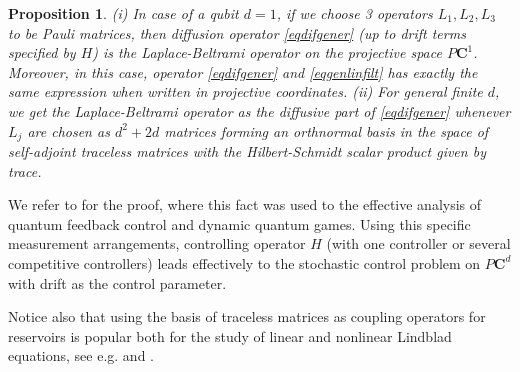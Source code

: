 \documentclass[12pt]{article}
\def\C{\mathbf{C}}
\newtheorem{prop}{Proposition}[section]
\begin{document}
\begin{prop}
\label{propOnLB}
 (i) In case of a qubit $d=1$, if we choose 3 operators $L_1,L_2,L_3$
to be Pauli matrices, then diffusion operator \eqref{eqdifgener}
(up to drift terms specified by $H$) is the
Laplace-Beltrami operator on the projective space $P\C^1$. Moreover, in this case,
operator \eqref{eqdifgener}  and \eqref{eqgenlinfilt} has exactly the same expression when
written in projective coordinates. (ii) For general finite $d$, we get the Laplace-Beltrami
operator as the diffusive part of \eqref{eqdifgener} whenever $L_j$ are chosen as $d^2+2d$
matrices forming an orthnormal basis in the space of self-adjoint traceless matrices
with the Hilbert-Schmidt scalar product given by trace.
\end{prop}

We refer to \cite{KolDynQuGames} for the proof, where this fact was used to the effective analysis
of quantum feedback control and dynamic quantum games. Using this specific measurement arrangements,
controlling operator $H$ (with one controller or several competitive controllers) leads effectively
to the stochastic control problem on $P\C^d$ with drift as the control parameter.

Notice also that using the basis of traceless matrices as coupling operators for reservoirs
is popular both for the study of linear and nonlinear Lindblad equations,
see e.g. \cite{Alicki} and \cite{Fernen}.
\end{document}
